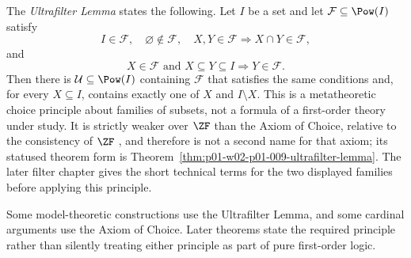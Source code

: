 \begin{definition}
\label{def:ultrafilter-lemma}
The \emph{Ultrafilter Lemma} states the following.  Let \(I\) be a set and let
\(\mathcal F\subseteq\Pow(I)\) satisfy
\[
 I\in\mathcal F,\quad\varnothing\notin\mathcal F,\quad
 X,Y\in\mathcal F\Rightarrow X\cap Y\in\mathcal F,
\]
and
\[
 X\in\mathcal F\text{ and }X\subseteq Y\subseteq I
 \Rightarrow Y\in\mathcal F.
\]
Then there is \(\mathcal U\subseteq\Pow(I)\) containing \(\mathcal F\) that
satisfies the same conditions and, for every \(X\subseteq I\), contains
exactly one of \(X\) and \(I\setminus X\).  This is a metatheoretic choice
principle about families of subsets, not a formula of a first-order theory
under study.  It is strictly weaker over \(\ZF\) than the Axiom of Choice,
relative to the consistency of \(\ZF\) \cite{HalpernLevy1971}, and
therefore is not a second name for that axiom; its statused theorem form is
Theorem~\ref{thm:p01-w02-p01-009-ultrafilter-lemma}.  The later filter chapter gives
the short technical terms for the two displayed families before applying this
principle.
\end{definition}

Some model-theoretic constructions use the Ultrafilter Lemma, and some cardinal
arguments use the Axiom of Choice.  Later theorems state the required principle
rather than silently treating either principle as part of pure first-order
logic.

